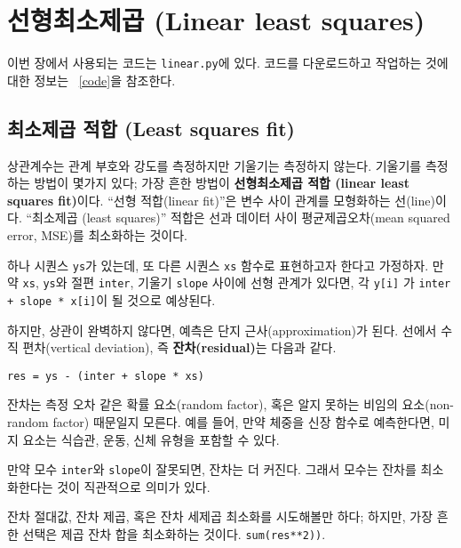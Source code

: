 
\chapter{선형최소제곱 (Linear least squares)}
\label{linear}

이번 장에서 사용되는 코드는 {\tt linear.py}에 있다.
코드를 다운로드하고 작업하는 것에 대한 정보는 ~\ref{code}을 참조한다.

\section{최소제곱 적합 (Least squares fit)}

상관계수는 관계 부호와 강도를 측정하지만 기울기는 측정하지 않는다.
기울기를 측정하는 방법이 몇가지 있다; 가장 흔한 방법이 {\bf 선형최소제곱 적합 (linear least squares fit)}이다. ``선형 적합(linear fit)''은 변수 사이 관계를 모형화하는 선(line)이다.
``최소제곱 (least squares)'' 적합은 선과 데이터 사이 평균제곱오차(mean
squared error, MSE)를 최소화하는 것이다.

하나 시퀀스 {\tt ys}가 있는데, 또 다른 시퀀스 {\tt xs} 함수로 표현하고자 한다고 가정하자.
만약 {\tt xs}, {\tt ys}와 절편 {\tt inter}, 기울기 {\tt slope} 사이에 선형 관계가 있다면,
각 {\tt y[i]} 가 {\tt inter + slope * x[i]}이 될 것으로 예상된다.  

하지만, 상관이 완벽하지 않다면, 예측은 단지 근사(approximation)가 된다.
선에서 수직 편차(vertical deviation), 즉 {\bf 잔차(residual)}는 다음과 같다. 

\begin{verbatim}
res = ys - (inter + slope * xs)
\end{verbatim}

잔차는 측정 오차 같은 확률 요소(random factor), 혹은 알지 못하는 비임의 요소(non-random factor) 때문일지 모른다. 예를 들어, 만약 체중을 신장 함수로 예측한다면, 미지 요소는 식습관, 운동, 신체 유형을 포함할 수 있다.


만약 모수 {\tt inter}와 {\tt slope}이 잘못되면, 잔차는 더 커진다.
그래서 모수는 잔차를 최소화한다는 것이 직관적으로 의미가 있다.

잔차 절대값, 잔차 제곱, 혹은 잔차 세제곱 최소화를 시도해볼만 하다;
하지만, 가장 흔한 선택은 제곱 잔차 합을 최소화하는 것이다. {\tt sum(res**2))}.

